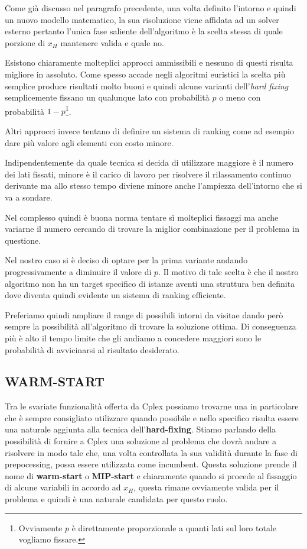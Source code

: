 \documentclass[11pt]{article}
\begin{document}
Come già discusso nel paragrafo precedente, una volta definito l'intorno e quindi un nuovo modello matematico, la sua risoluzione viene affidata ad un solver esterno pertanto l'unica fase saliente dell'algoritmo è la scelta stessa di quale porzione di $x_H$ mantenere valida e quale no. 

Esistono chiaramente molteplici approcci ammissibili e nessuno di questi risulta migliore in assoluto. Come spesso accade negli algoritmi euristici la scelta più semplice produce risultati molto buoni e quindi alcune varianti dell'\textit{hard fixing} semplicemente fissano un qualunque lato con probabilità $p$ o meno con probabilità $1-p$\footnote{Ovviamente $p$ è direttamente proporzionale a quanti lati sul loro totale vogliamo fissare.}.

Altri approcci invece tentano di definire un sistema di ranking come ad esempio dare più valore agli elementi con costo minore.

Indipendentemente da quale tecnica si decida di utilizzare maggiore è il numero dei lati fissati, minore è il carico di lavoro per risolvere il rilassamento continuo derivante ma allo stesso tempo diviene minore anche l'ampiezza dell'intorno che si va a sondare.

Nel complesso quindi è buona norma tentare sì molteplici fissaggi ma anche variarne il numero cercando di trovare la miglior combinazione per il problema in questione.

Nel nostro caso si è deciso di optare per la prima variante andando progressivamente a diminuire il valore di $p$. Il motivo di tale scelta è che il nostro algoritmo non ha un target specifico di istanze aventi una struttura ben definita dove diventa quindi evidente un sistema di ranking efficiente.

Preferiamo quindi ampliare il range di possibili intorni da visitae dando però sempre la possibilità all'algoritmo di trovare la soluzione ottima. Di conseguenza più è alto il tempo limite che gli andiamo a concedere maggiori sono le probabilità di avvicinarsi al risultato desiderato.

\subsection*{WARM-START}
\label{sec:WarmStartS}

Tra le svariate funzionalità offerta da Cplex possiamo trovarne una in particolare che è sempre consigliato utilizzare quando possibile e nello specifico risulta essere una naturale aggiunta alla tecnica dell'\textbf{hard-fixing}. Stiamo parlando della possibilità di fornire a Cplex una soluzione al problema che dovrà andare a risolvere in modo tale che, una volta controllata la sua validità durante la fase di prepocessing, possa essere utilizzata come incumbent. Questa soluzione prende il nome di \textbf{warm-start} o \textbf{MIP-start} e chiaramente quando si procede al fissaggio di alcune variabili in accordo ad $x_H$, questa rimane ovviamente valida per il problema e quindi è una naturale candidata per questo ruolo.
\end{document}
